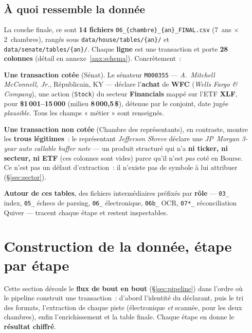 \documentclass[11pt,a4paper]{article}
\newcommand{\co}[1]{\texttt{\small #1}}
\begin{document}
\subsection{À quoi ressemble la donnée}
\label{sec:numbering}
La couche finale, ce sont \textbf{14 fichiers} \co{06_\{chambre\}_\{an\}_FINAL.csv} (7~ans $\times$
2~chambres), rangés sous \co{data/house/tables/\{an\}/} et \co{data/senate/tables/\{an\}/}. Chaque
\textbf{ligne} est une transaction et porte \textbf{28 colonnes} (détail en annexe~\ref{anx:schema}).
Concrètement~:

\textbf{Une transaction cotée} (Sénat). Le sénateur \co{M000355} — \emph{A.~Mitchell McConnell, Jr.},
Républicain, KY — déclare l'\textbf{achat} de \textbf{WFC} (\emph{Wells Fargo \& Company}), une action
(\co{Stock}) du secteur \textbf{Financials} mappé sur l'ETF \textbf{XLF}, pour \textbf{\$1\,001--15\,000}
(milieu \textbf{8\,000,5\,\$}), détenue par le conjoint, date jugée \emph{plausible}. Tous les champs
« métier » sont renseignés.

\textbf{Une transaction non cotée} (Chambre des représentants), en contraste, montre les \textbf{trous
légitimes}~: le représentant \emph{Jefferson Shreve} déclare une \emph{JP~Morgan 3-year auto callable
buffer note} — un produit structuré qui n'a \textbf{ni ticker, ni secteur, ni ETF} (ces colonnes sont
vides) parce qu'il n'est \emph{pas} coté en Bourse. Ce n'est pas un défaut d'extraction~: il n'existe pas
de symbole à lui attribuer (§\ref{sec:sector}).

\textbf{Autour de ces tables}, des fichiers intermédiaires préfixés par \textbf{rôle} — \co{03_} index,
\co{05_} échecs de parsing, \co{06_} électronique, \co{06b_} OCR, \co{07*_} réconciliation Quiver — tracent
chaque étape et restent inspectables.

\section{Construction de la donnée, étape par étape}
\label{sec:construction}

Cette section déroule le \textbf{flux de bout en bout} (§\ref{sec:pipeline}) dans l'ordre où le pipeline
construit une transaction~: d'abord l'identité du déclarant, puis le tri des formats, l'extraction de
chaque piste (électronique \emph{et} scannée, pour les deux chambres), enfin l'enrichissement et la table
finale. Chaque étape en donne le \textbf{résultat chiffré}.
\end{document}
